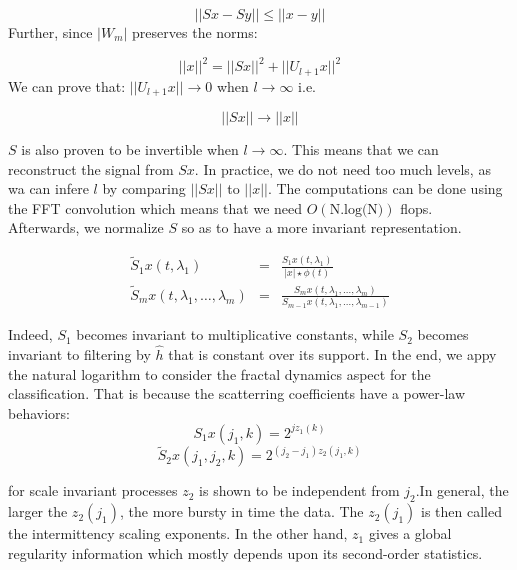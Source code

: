 \documentclass[onecolumn,12pt]{article}
\begin{document}
		$$||Sx-Sy|| \leq ||x-y||$$
	 Further, since $|W_m|$ preserves the norms:
	 
	 $$||x||^2=||Sx||^2+ ||U_{l+1}x||^2$$
	   We can prove that: $||U_{l+1}x|| \rightarrow 0$ when $l\rightarrow\infty$ i.e.
	   
	   $$||Sx||\rightarrow ||x||$$
	   
	   $S$ is also proven to be invertible when $l\rightarrow\infty$. This means that we can reconstruct the signal from $Sx$. In practice, we do not need too much levels, as wa can infere $l$ by comparing $||Sx||$ to $||x||$. The computations can be done using the FFT convolution which means that we need $O(\text{N.log(N)})$ flops.\\
	   
	   Afterwards, we normalize $S$ so as to have a more invariant representation.
	   
	   \begin{eqnarray}
	   	\tilde{S}_1x(t,\lambda_1)&=&\frac{S_1x(t,\lambda_1)}{|x|\star \phi(t)}\\
	   	\tilde{S}_mx(t,\lambda_1,\dots,\lambda_m)&=&\frac{S_mx(t,\lambda_1,\dots,\lambda_m)}{S_{m-1}x(t,\lambda_1,\dots,\lambda_{m-1})}
	   \end{eqnarray}
	
	Indeed, $S_1$ becomes invariant to multiplicative constants, while $S_2$ becomes invariant to filtering by $\widehat{h}$ that is constant over its support. In the end, we appy the natural logarithm to consider the fractal dynamics aspect for the classification. That is because the scatterring coefficients have a power-law behaviors:
	$$S_1x(j_1,k)=2^{ jz_1(k)}$$
	$$\tilde{S}_2x(j_1,j_2,k)=2^{(j_2-j_1)z_2(j_1,k)}$$
	
	for scale invariant processes $z_2$ is shown to be independent from $j_2$.In general, the larger the $z_2 (j_1 )$, the more bursty in time the data. The $z_2 (j_1 )$ is then called the intermittency scaling exponents. In the other hand, $z_1$ gives a global regularity information which mostly depends upon its second-order statistics.
	
\end{document}
